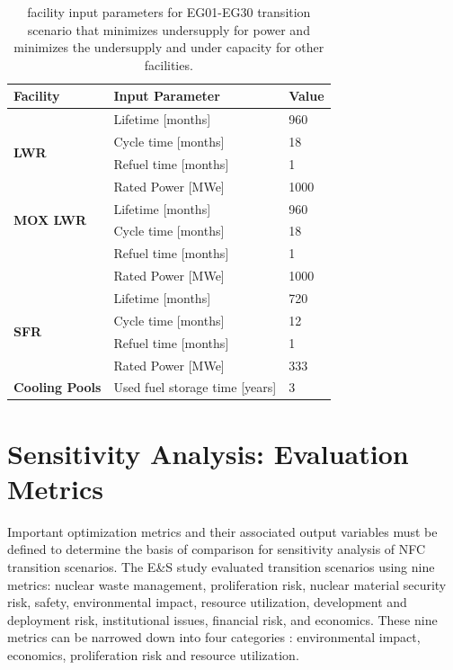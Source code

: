 \begin{table}[H]
    \centering
    \doublespacing
    \caption{\Cyclus facility input parameters for
	EG01-EG30 transition scenario
	that minimizes undersupply for power and minimizes 
	the undersupply and under capacity for other facilities. }
	\label{tab:facinputs}
    \small
    \begin{tabular}{lll}
        \hline
        \textbf{Facility}                 & \textbf{Input Parameter}                    & \textbf{Value} \\ \hline
        \multirow{4}{*}{\textbf{LWR}}     & Lifetime {[}months{]}              & 960   \\
                                 & Cycle time {[}months{]}            & 18    \\
                                 & Refuel time {[}months{]}           & 1     \\
                                 & Rated Power {[}MWe{]}              & 1000  \\ \hline
        \multirow{2}{*}{\textbf{MOX LWR}} & Lifetime {[}months{]}              & 960   \\
                                 & Cycle time {[}months{]}            & 18    \\
                                 & Refuel time {[}months{]}           & 1     \\
                                 & Rated Power {[}MWe{]}              & 1000  \\ \hline
        \multirow{4}{*}{\textbf{SFR}}     & Lifetime {[}months{]}              & 720   \\
                                 & Cycle time {[}months{]}            & 12    \\
                                 & Refuel time {[}months{]}           & 1     \\
                                 & Rated Power {[}MWe{]}              & 333   \\ \hline
        \textbf{Cooling Pools}            & Used fuel storage time {[}years{]} & 3  \\ \hline
        \end{tabular}
    \end{table}

\section{Sensitivity Analysis: Evaluation Metrics}
Important optimization metrics and their associated output variables 
must be defined to determine the basis of comparison for sensitivity 
analysis of \gls{NFC} transition scenarios.
The E\&S study \cite{wigeland_nuclear_2014} evaluated transition 
scenarios using nine metrics: nuclear waste 
management, proliferation risk, nuclear material security risk, 
safety, environmental impact, resource utilization, development 
and deployment risk, institutional issues, financial risk, and 
economics. 
These nine metrics can be narrowed down into four categories
 \cite{passerini_systematic_2014}: environmental 
impact, economics, proliferation risk and resource utilization. 

